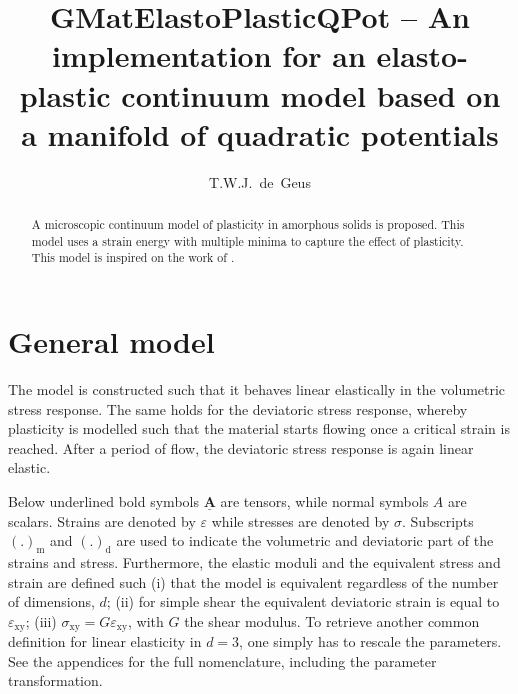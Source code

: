 \documentclass[times,namecite]{goose-article}
\title{%
  GMatElastoPlasticQPot -- An implementation for an elasto-plastic continuum model based on a manifold of quadratic potentials
}
\author{T.W.J.~de~Geus}
\newcommand\T[1]{\underline{\bm{{#1}}}}
\begin{document}
\maketitle

\begin{abstract}
A microscopic continuum model of plasticity in amorphous solids is proposed. This model uses a strain energy with multiple minima to capture the effect of plasticity. This model is inspired on the work of \citet{Jagla2017}.
\end{abstract}


\setcounter{tocdepth}{3}
\tableofcontents

\vfill\newpage
\section{General model}

The model is constructed such that it behaves linear elastically in the volumetric stress response. The same holds for the deviatoric stress response, whereby plasticity is modelled such that the material starts flowing once a critical strain is reached. After a period of flow, the deviatoric stress response is again linear elastic.

Below underlined bold symbols $\T{A}$ are tensors, while normal symbols $A$ are scalars. Strains are denoted by $\varepsilon$ while stresses are denoted by $\sigma$. Subscripts $(.)_\mathrm{m}$ and $(.)_\mathrm{d}$ are used to indicate the volumetric and deviatoric part of the strains and stress. Furthermore, the elastic moduli and the equivalent stress and strain are defined such (i) that the model is equivalent regardless of the number of dimensions, $d$; (ii) for simple shear the equivalent deviatoric strain is equal to $\varepsilon_\mathrm{xy}$; (iii) $\sigma_\mathrm{xy} = G \varepsilon_\mathrm{xy}$, with $G$ the shear modulus. To retrieve another common definition for linear elasticity in $d = 3$, one simply has to rescale the parameters. See the appendices for the full nomenclature, including the parameter transformation.
\end{document}
